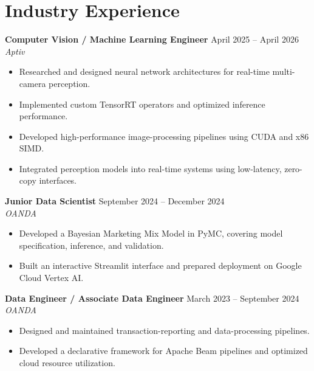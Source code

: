 \documentclass[11pt,a4paper]{article}
\begin{document}
\section*{Industry Experience}
\noindent\textbf{Computer Vision / Machine Learning Engineer} \hfill {\small\color{graytext} April 2025 -- April 2026}\\
\textit{Aptiv}\par
\begin{itemize}[leftmargin=1.2em,topsep=0.5pt,itemsep=0.3pt,parsep=0pt]
  \item Researched and designed neural network architectures for real-time multi-camera perception.
  \item Implemented custom TensorRT operators and optimized inference performance.
  \item Developed high-performance image-processing pipelines using CUDA and x86 SIMD.
  \item Integrated perception models into real-time systems using low-latency, zero-copy interfaces.
\end{itemize}
\vspace{0.5pt}
\noindent\textbf{Junior Data Scientist} \hfill {\small\color{graytext} September 2024 -- December 2024}\\
\textit{OANDA}\par
\begin{itemize}[leftmargin=1.2em,topsep=0.5pt,itemsep=0.3pt,parsep=0pt]
  \item Developed a Bayesian Marketing Mix Model in PyMC, covering model specification, inference, and validation.
  \item Built an interactive Streamlit interface and prepared deployment on Google Cloud Vertex AI.
\end{itemize}
\vspace{0.5pt}
\noindent\textbf{Data Engineer / Associate Data Engineer} \hfill {\small\color{graytext} March 2023 -- September 2024}\\
\textit{OANDA}\par
\begin{itemize}[leftmargin=1.2em,topsep=0.5pt,itemsep=0.3pt,parsep=0pt]
  \item Designed and maintained transaction-reporting and data-processing pipelines.
  \item Developed a declarative framework for Apache Beam pipelines and optimized cloud resource utilization.
\end{itemize}
\vspace{0.5pt}
\end{document}
